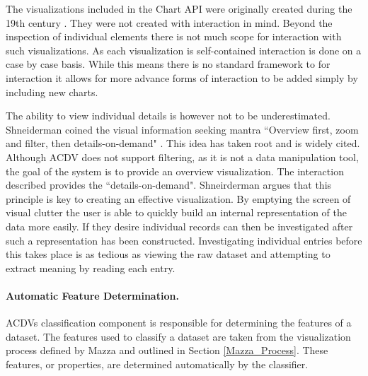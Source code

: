 \documentclass[a4paper, 11pt, titlepage, onehalfspacing]{report}
\begin{document}
The visualizations included in the Chart API were originally created during the 19th century \cite{friendly2001milestones}. They were not created with interaction in mind. Beyond the inspection of individual elements there is not much scope for interaction with such visualizations. As each visualization is self-contained interaction is done on a case by case basis. While this means there is no standard framework to for interaction it allows for more advance forms of interaction to be added simply by including new charts.

The ability to view individual details is however not to be underestimated. Shneiderman coined the visual information seeking mantra ``Overview first, zoom and filter, then details-on-demand" \cite{shneiderman1996eyes}. This idea has taken root and is widely cited. Although AC\lightning{}DV does not support filtering, as it is not a data manipulation tool, the goal of the system is to provide an overview visualization. The interaction described provides the ``details-on-demand". Shneirderman argues that this principle is key to creating an effective visualization. By emptying the screen of visual clutter the user is able to quickly build an internal representation of the data more easily. If they desire individual records can then be investigated after such a representation has been constructed. Investigating individual entries before this takes place is as tedious as viewing the raw dataset and attempting to extract meaning by reading each entry.

\paragraph{Automatic Feature Determination.}
AC\lightning{}DVs classification component is responsible for determining the features of a dataset. The features used to classify a dataset are taken from the visualization process defined by Mazza and outlined in Section \ref{Mazza_Process}. These features, or properties, are determined automatically by the classifier.
\end{document}
